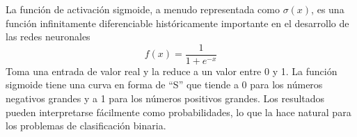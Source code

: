 \documentclass[12pt]{article}
\begin{document}
      La función de activación sigmoide, a menudo representada como \(\sigma(x)\), es una función infinitamente diferenciable 
      históricamente importante en el desarrollo de las redes neuronales
      \[ f(x) = \frac{1}{1+e^{-x}}\]
      Toma una entrada de valor real y la reduce a un valor entre 0 y 1. La función sigmoide tiene una curva en forma de ``S'' 
      que tiende a 0 para los números negativos grandes y a 1 para los números positivos grandes. Los resultados pueden interpretarse 
      fácilmente como probabilidades, lo que la hace natural para los problemas de clasificación binaria.
    
\end{document}
